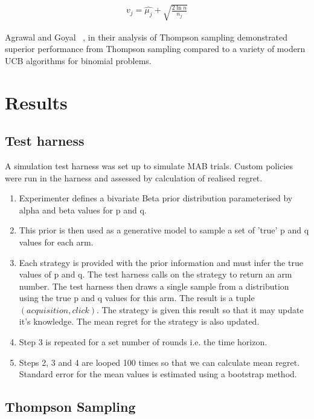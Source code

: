 \documentclass[11pt,a4,singlespacing,titlepagenumber=on]{scrreprt}
\numberwithin{equation}{chapter} %
\theoremstyle{remark}
\begin{document}
\begin{align}
v_j = \hat{\mu_j} + \sqrt{ \frac{2 \ln{n}}{n_j}  }
\end{align}

Agrawal and Goyal ~\cite{DBLP:journals/corr/abs-1111-1797}, in their analysis of Thompson sampling demonstrated superior performance from Thompson sampling compared to a variety of modern UCB algorithms for binomial problems.

\chapter{ Results }

\section{Test harness}

A simulation test harness was set up to simulate MAB trials. Custom policies were run in the harness and assessed by calculation of realised regret.

\begin{enumerate}
	\item Experimenter defines a bivariate Beta prior distribution parameterised by alpha and beta values for p and q.
	\item This prior is then used as a generative model to sample a set of 'true' p and q values for each arm.
	\item Each strategy is provided with the prior information and must infer the true values of p and q. The test harness calls on the strategy to return an arm number. The test harness then draws a single sample from a distribution using the true p and q values for this arm. The result is a tuple $(acquisition,click)$. The strategy is given this result so that it may update it's knowledge. The mean regret for the strategy is also updated.
	\item Step 3 is repeated for a set number of rounds i.e. the time horizon.
	\item Steps 2, 3 and 4 are looped 100 times so that we can calculate mean regret. Standard error for the mean values is estimated using a bootstrap method.
\end{enumerate}





\section{Thompson Sampling}
\end{document}
